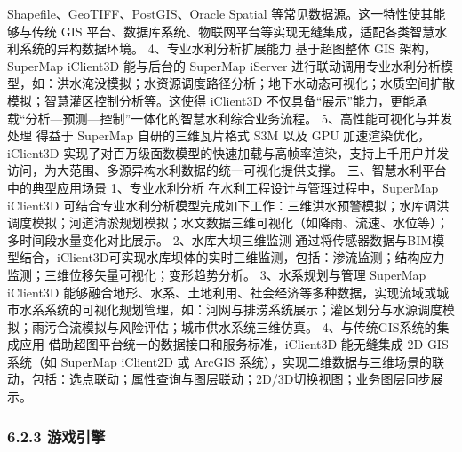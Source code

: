 {Shapefile、GeoTIFF、PostGIS、Oracle Spatial 等常见数据源。这一特性使其能够与传统 GIS 平台、数据库系统、物联网平台等实现无缝集成，适配各类智慧水利系统的异构数据环境。 4、专业水利分析扩展能力
基于超图整体 GIS 架构，SuperMap iClient3D 能与后台的 SuperMap iServer
进行联动调用专业水利分析模型，如：洪水淹没模拟；水资源调度路径分析；地下水动态可视化；水质空间扩散模拟；智慧灌区控制分析等。这使得 iClient3D
不仅具备``展示''能力，更能承载``分析---预测---控制''一体化的智慧水利综合业务流程。 5、高性能可视化与并发处理 得益于 SuperMap 自研的三维瓦片格式 S3M 以及 GPU 加速渲染优化，iClient3D
实现了对百万级面数模型的快速加载与高帧率渲染，支持上千用户并发访问，为大范围、多源异构水利数据的统一可视化提供支撑。 三、智慧水利平台中的典型应用场景 1、专业水利分析 在水利工程设计与管理过程中，SuperMap iClient3D
可结合专业水利分析模型完成如下工作：三维洪水预警模拟；水库调洪调度模拟；河道清淤规划模拟；水文数据三维可视化（如降雨、流速、水位等）；多时间段水量变化对比展示。 2、水库大坝三维监测
通过将传感器数据与BIM模型结合，iClient3D可实现水库坝体的实时三维监测，包括：渗流监测；结构应力监测；三维位移矢量可视化；变形趋势分析。 3、水系规划与管理 SuperMap iClient3D
能够融合地形、水系、土地利用、社会经济等多种数据，实现流域或城市水系系统的可视化规划管理，如：河网与排涝系统展示；灌区划分与水源调度模拟；雨污合流模拟与风险评估；城市供水系统三维仿真。 4、与传统GIS系统的集成应用
借助超图平台统一的数据接口和服务标准，iClient3D 能无缝集成 2D GIS 系统（如 SuperMap iClient2D 或 ArcGIS
系统），实现二维数据与三维场景的联动，包括：选点联动；属性查询与图层联动；2D/3D切换视图；业务图层同步展示。 \subsubsection{6.2.3 游戏引擎}\label{ux6e38ux620fux5f15ux64ce}
}
